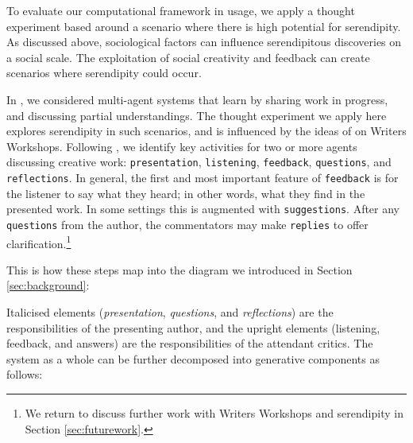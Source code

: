 To evaluate our computational framework in usage, we apply a thought experiment based around a scenario where there is high potential for serendipity. As discussed above, sociological factors can influence serendipitous discoveries on a social scale.  The exploitation of social creativity and feedback can create scenarios where serendipity could occur. 

In \cite{poetry-workshop}, we considered multi-agent systems that learn by sharing work in progress, and
discussing partial understandings.  %
The thought experiment we apply here explores serendipity in such scenarios, and is influenced by the ideas of  on Writers Workshops. Following , we identify key activities for two or more agents discussing creative work: {\tt presentation}, {\tt listening}, {\tt feedback}, {\tt questions},
and {\tt reflections}.  In general, the first and most important
feature of {\tt feedback} is for the listener to say what they heard;
in other words, what they find in the presented work.  In some
settings this is augmented with {\tt suggestions}.  After any {\tt
  questions} from the author, the commentators may make {\tt replies}
to offer clarification.\footnote{We return to discuss further work with Writers Workshops and serendipity in Section \ref{sec:futurework}.} 

This is how these steps map into the diagram
we introduced in Section \ref{sec:background}:



Italicised elements (\emph{presentation}, \emph{questions}, and
\emph{reflections}) are the responsibilities of the presenting author,
and the upright elements (listening, feedback, and
answers) are the responsibilities of the attendant critics.
%
The system as a whole can be further decomposed into generative
components as follows:

